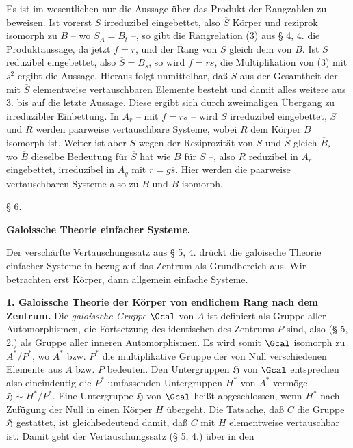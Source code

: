 Es ist im wesentlichen nur die Aussage über das Produkt der Rangzahlen zu beweisen. Ist vorerst \(S\) irreduzibel eingebettet, also \(\overline S\) Körper und reziprok isomorph zu \(B\) -- wo \(S_A=B_t\) --, so gibt die Rangrelation (3) aus § 4, 4. die Produktaussage, da jetzt \(f=r\), und der Rang von \(\overline S\) gleich dem von \(B\). Ist \(S\) reduzibel eingebettet, also \(\overline S=B_s\), so wird \(f=rs\), die Multiplikation von (3) mit \(s^2\) ergibt die Aussage. Hieraus folgt unmittelbar, daß \(S\) aus der Gesamtheit der mit \(\overline S\) elementweise vertauschbaren Elemente besteht und damit alles weitere aus 3. bis auf die letzte Aussage. Diese ergibt sich durch zweimaligen Übergang zu irreduzibler Einbettung. In \(A_r\) -- mit \(f=rs\) -- wird \(S\) irreduzibel eingebettet, \(S\) und \(R\) werden paarweise vertauschbare Systeme, wobei \(R\) dem Körper \(B\) isomorph ist. Weiter ist aber \(S\) wegen der Reziprozität von \(S\) und \(\overline S\) gleich \(\overline B_s\) -- wo \(\overline B\) dieselbe Bedeutung für \(\overline S\) hat wie \(B\) für \(S\) --, also \(R\) reduzibel in \(A_r\) eingebettet, irreduzibel in \(A_g\) mit \(r=g\overline s\). Hier werden die paarweise vertauschbaren Systeme also zu \(B\) und \(\overline B\) isomorph.

\begin{center}
§ 6.

\textbf{Galoissche Theorie einfacher Systeme.}
\end{center}

Der verschärfte Vertauschungssatz aus § 5, 4. drückt die galoissche Theorie einfacher Systeme in bezug auf das Zentrum als Grundbereich aus. Wir betrachten erst Körper, dann allgemein einfache Systeme.

\noindent\textbf{1. Galoissche Theorie der Körper von endlichem Rang nach dem Zentrum.} Die \emph{galoissche Gruppe} \(\Gcal\) von \(A\) ist definiert als Gruppe aller Automorphismen, die Fortsetzung des identischen des Zentrums \(P\) sind, also (§ 5, 2.) als Gruppe aller inneren Automorphismen. Es wird somit \(\Gcal\) isomorph zu \(A^*/P^*\), wo \(A^*\) bzw. \(P^*\) die multiplikative Gruppe der von Null verschiedenen Elemente aus \(A\) bzw. \(P\) bedeuten. Den Untergruppen \(\mathfrak H\) von \(\Gcal\) entsprechen also eineindeutig die \(P^*\) umfassenden Untergruppen \(H^*\) von \(A^*\) vermöge \(\mathfrak H\sim H^*/P^*\).
Eine Untergruppe \(\mathfrak H\) von \(\Gcal\) heißt abgeschlossen, wenn \(H^*\) nach Zufügung der Null in einen Körper \(H\) übergeht. Die Tatsache, daß \(C\) die Gruppe \(\mathfrak H\) gestattet, ist gleichbedeutend damit, daß \(C\) mit \(H\) elementweise vertauschbar ist. Damit geht der Vertauschungssatz (§ 5, 4.) über in den

